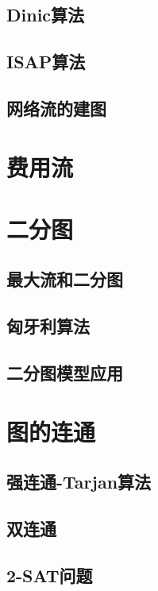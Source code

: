 \documentclass[fontset=ubuntu]{ctexbook}
\begin{document}
    \subsection{Dinic算法}
    \subsection{ISAP算法}
    \subsection{网络流的建图}
    \section{费用流}
    \section{二分图}
    \subsection{最大流和二分图}
    \subsection{匈牙利算法}
    \subsection{二分图模型应用}
    \section{图的连通}
    \subsection{强连通-Tarjan算法}
    \subsection{双连通}
    \subsection{2-SAT问题}
\end{document}
